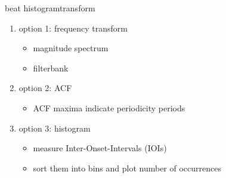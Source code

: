             \begin{frame}{beat histogram}{transform}
                    \begin{enumerate}
                        \item<1->   option 1: frequency transform
                            \begin{itemize}
                                \item   magnitude spectrum
                                \item   filterbank
                            \end{itemize}
                        \bigskip
                        \item<1->   option 2: ACF
                            \begin{itemize}
                                \item   ACF maxima indicate periodicity periods
                            \end{itemize}
                        \bigskip
                        \item<1->   option 3: histogram
                            \begin{itemize}
                                \item   measure Inter-Onset-Intervals (IOIs)
                                \item   sort them into bins and plot number of occurrences
                            \end{itemize}
                    \end{enumerate}
            \end{frame}
            
